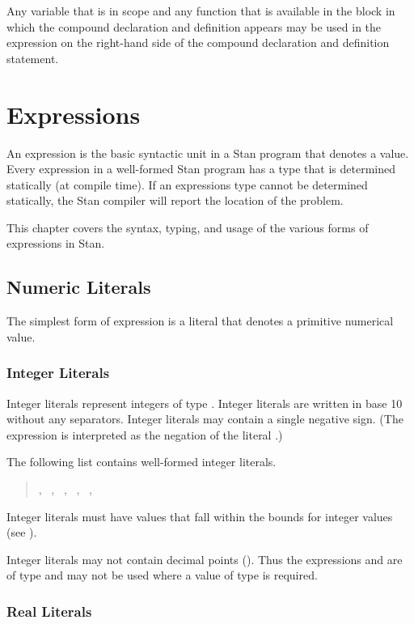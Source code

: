 Any variable that is in scope and any function that is available in
the block in which the compound declaration and definition appears may
be used in the expression on the right-hand side of the compound
declaration and definition statement.

\chapter{Expressions}

\noindent
An expression is the basic syntactic unit in a Stan program that
denotes a value.  Every expression in a well-formed Stan program has
a type that is determined statically (at compile time).  If an
expressions type cannot be determined statically, the Stan compiler
will report the location of the problem.

This chapter covers the syntax, typing, and usage of the various forms
of expressions in Stan.

\section{Numeric Literals}

The simplest form of expression is a literal that denotes a primitive
numerical value.

\subsection{Integer Literals}

Integer literals represent integers of type .  Integer
literals are written in base 10 without any separators.  Integer
literals may contain a single negative sign.  (The expression
 is interpreted as the negation of the literal .)

The following list contains well-formed integer literals.
%
\begin{quote}
, \ , \ , \ ,
\ , \ 
\end{quote}
%
Integer literals must have values that fall within the bounds for
integer values (see ).

Integer literals may not contain decimal points ().  Thus the
expressions  and  are of type  and may
not be used where a value of type  is required.

\subsection{Real Literals}

